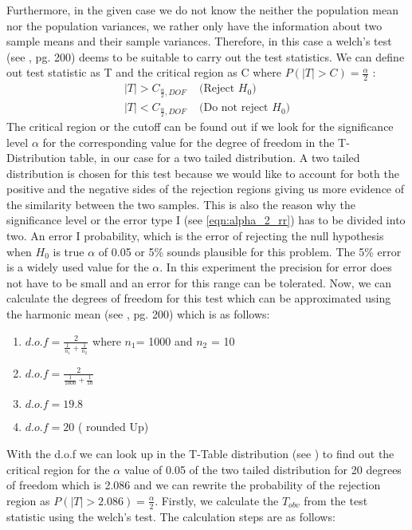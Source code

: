Furthermore, in the given case we do not know the neither the population mean nor the population variances, we rather only have the information about two sample means and their sample variances. Therefore, in this case a welch's test (see \cite{hogg:2005}, pg. 200) deems to be suitable to carry out the test statistics. We can define out test statistic as T and the critical region as C where $P(|T| > C) =\frac{\alpha}{2}$ \label{eqn:alpha_2_rr}:
\begin{equation}
    \begin{split}
      |T| > C_{\frac{\alpha}{2}, DOF}& \text{ (Reject $H_0$)}\\
      |T| < C_{\frac{\alpha}{2}, DOF}& \text{ (Do not reject $H_0$)}
    \end{split}
\end{equation}
The critical region or the cutoff can be found out if we look for the significance level $\alpha$ for the corresponding value for the degree of freedom in the T-Distribution table, in our case for a two tailed distribution. A two tailed distribution is chosen for this test because we would like to account for both the positive and the negative sides of the rejection regions giving us more evidence of the similarity between the two samples. This is also the reason why the significance level or the error type I (see \ref{eqn:alpha_2_rr}) has to be divided into two. \newline \newline
An error I probability, which is the error of rejecting the null hypothesis when $H_0$ is true $\alpha$ of 0.05 or 5\% sounds plausible for this problem. The 5\% error is a widely used value for the $\alpha$. In this experiment the precision for error does not have to be small and an error for this range can be tolerated. Now, we can calculate the degrees of freedom for this test which can be approximated using the harmonic mean (see \cite{Iubh:2021}, pg. 200) which is as follows:
\begin{enumerate}
    \item $d.o.f = \frac{2}{\frac{1}{n_1}+\frac{1}{n_2}}$ where $n_1$= 1000 and $n_2$ = 10
    \item $d.o.f = \frac{2}{\frac{1}{1000}+\frac{1}{10}}$
    \item $d.o.f = 19.8$
    \item $d.o.f = 20$ ( rounded Up)
\end{enumerate}
With the d.o.f we can look up in the T-Table distribution (see \cite{t-table}) to find out the critical region for the $\alpha$ value of 0.05 of the two tailed distribution for 20 degrees of freedom which is 2.086 and we can rewrite the probability of the rejection region as $P(|T| > 2.086) = \frac{\alpha}{2}$. Firstly, we calculate the $T_{obv}$ from the test statistic using the welch's test. The calculation steps are as follows:
